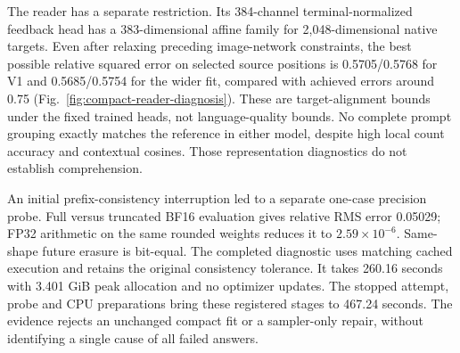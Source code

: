 \documentclass[12pt,a4paper]{article}
\begin{document}
The reader has a separate restriction. Its 384-channel terminal-normalized
feedback head has a 383-dimensional affine family for 2,048-dimensional
native targets. Even after relaxing preceding image-network constraints,
the best possible relative squared error on selected source positions is
0.5705/0.5768 for V1 and 0.5685/0.5754 for the wider fit, compared with
achieved errors around 0.75 (Fig.~\ref{fig:compact-reader-diagnosis}).
These are target-alignment bounds under the fixed trained heads, not
language-quality bounds. No complete prompt grouping exactly matches the
reference in either model, despite high local count accuracy and contextual
cosines. Those representation diagnostics do not establish comprehension.

An initial prefix-consistency interruption led to a separate one-case
precision probe. Full versus truncated BF16 evaluation gives relative RMS
error 0.05029; FP32 arithmetic on the same rounded weights reduces it to
$2.59\times10^{-6}$. Same-shape future erasure is bit-equal. The completed
diagnostic uses matching cached execution and retains the original
consistency tolerance. It takes 260.16 seconds with 3.401 GiB peak allocation
and no optimizer updates. The stopped attempt, probe and CPU preparations
bring these registered stages to 467.24 seconds. The evidence rejects an
unchanged compact fit or a sampler-only repair, without identifying a single
cause of all failed answers.


\end{document}
